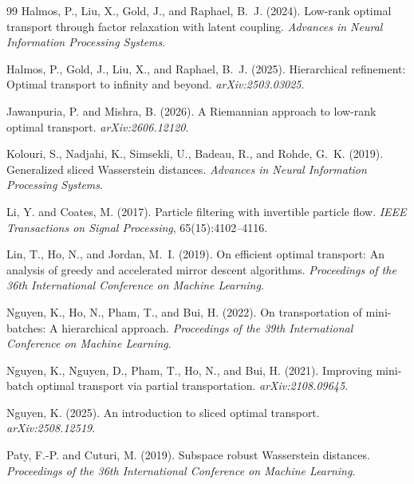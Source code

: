\documentclass[11pt]{article}
\begin{document}
\begin{thebibliography}{99}
Halmos, P., Liu, X., Gold, J., and Raphael, B.~J. (2024).
\newblock Low-rank optimal transport through factor relaxation with latent
coupling.
\newblock \emph{Advances in Neural Information Processing Systems}.

Halmos, P., Gold, J., Liu, X., and Raphael, B.~J. (2025).
\newblock Hierarchical refinement: Optimal transport to infinity and beyond.
\newblock \emph{arXiv:2503.03025}.

Jawanpuria, P. and Mishra, B. (2026).
\newblock A Riemannian approach to low-rank optimal transport.
\newblock \emph{arXiv:2606.12120}.

Kolouri, S., Nadjahi, K., Simsekli, U., Badeau, R., and Rohde, G.~K. (2019).
\newblock Generalized sliced Wasserstein distances.
\newblock \emph{Advances in Neural Information Processing Systems}.

Li, Y. and Coates, M. (2017).
\newblock Particle filtering with invertible particle flow.
\newblock \emph{IEEE Transactions on Signal Processing}, 65(15):4102--4116.

Lin, T., Ho, N., and Jordan, M.~I. (2019).
\newblock On efficient optimal transport: An analysis of greedy and
accelerated mirror descent algorithms.
\newblock \emph{Proceedings of the 36th International Conference on Machine
Learning}.

Nguyen, K., Ho, N., Pham, T., and Bui, H. (2022).
\newblock On transportation of mini-batches: A hierarchical approach.
\newblock \emph{Proceedings of the 39th International Conference on Machine
Learning}.

Nguyen, K., Nguyen, D., Pham, T., Ho, N., and Bui, H. (2021).
\newblock Improving mini-batch optimal transport via partial transportation.
\newblock \emph{arXiv:2108.09645}.

Nguyen, K. (2025).
\newblock An introduction to sliced optimal transport.
\newblock \emph{arXiv:2508.12519}.

Paty, F.-P. and Cuturi, M. (2019).
\newblock Subspace robust Wasserstein distances.
\newblock \emph{Proceedings of the 36th International Conference on Machine
Learning}.


\end{thebibliography}
\end{document}
